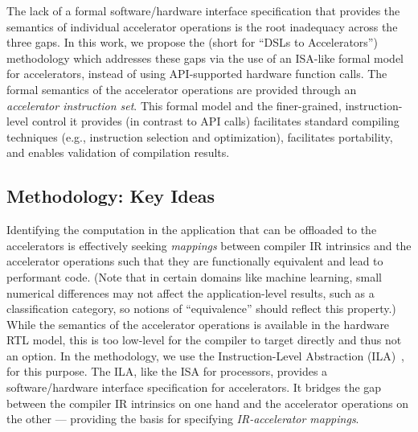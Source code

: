 The lack of a formal software/hardware interface specification that provides the semantics of individual accelerator operations is the root inadequacy across the three gaps.
%
In this work, we propose the {\TLA} (short for ``DSLs to Accelerators'') methodology which addresses these gaps via the use of an ISA-like formal model for accelerators, instead of using API-supported hardware function calls.
%
%
The formal semantics of the accelerator operations are provided through an \emph{accelerator instruction set}.
%
This formal model and the finer-grained, instruction-level control it provides (in contrast to API calls) facilitates standard compiling techniques (e.g., instruction selection and optimization), facilitates portability, and enables validation of compilation results.

\subsection{{\TLA} Methodology: Key Ideas}

Identifying the computation in the application that can be offloaded to the accelerators is effectively seeking \emph{mappings} between compiler IR intrinsics and the accelerator operations such that they are functionally equivalent and lead to performant code. 
%
(Note that in certain domains like machine learning, small numerical differences may not affect the application-level results, such as a classification category, so notions of ``equivalence'' should reflect this property.)
%
%
While the semantics of the accelerator operations is available in the hardware RTL model, this is too low-level for the compiler to target directly and thus not an option.
% 
In the {\TLA} methodology, we use the Instruction-Level Abstraction (ILA)~\cite{huang2018instruction}, 
for this purpose.
%
The ILA, like the ISA for processors, provides a  software/hardware interface specification for accelerators. 
It bridges the gap between the compiler IR intrinsics on one hand and the accelerator operations on the other --- providing the basis for specifying \emph{IR-accelerator mappings}.

